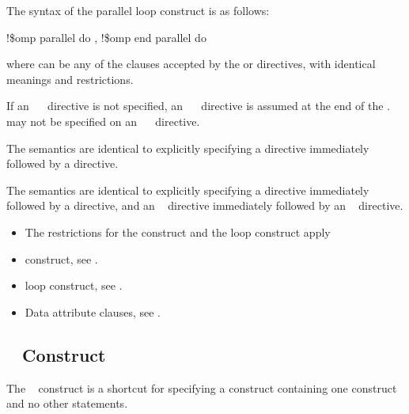 \fortranspecificstart
The syntax of the parallel loop construct is as follows:

\begin{boxedcode}
!\$omp parallel do \plc{[clause[ [},\plc{] clause] ... ]}
\plc{[}!\$omp end parallel do\plc{]} 
\end{boxedcode}

where  can be any of the clauses accepted by the  or  directives, 
with identical meanings and restrictions. 

If an ~~ directive is not specified, an ~~ directive is 
assumed at the end of the .  may not be specified on an 
~~ directive.
\fortranspecificend

\descr
\ccppspecificstart
The semantics are identical to explicitly specifying a  directive immediately 
followed by a  directive.
\ccppspecificend

\fortranspecificstart
The semantics are identical to explicitly specifying a  directive immediately 
followed by a  directive, and an ~ directive immediately followed by an 
~ directive. 
\fortranspecificend

\restrictions
\begin{itemize}
\item The restrictions for the  construct and the loop construct apply
\end{itemize}

\crossreferences
\begin{itemize}
\item {} construct, see 
.

\item loop construct, see 
.

\item Data attribute clauses, see 
.
\end{itemize}








\pagebreak

\subsection{~ Construct}
\label{subsec:parallel sections Construct}
\summary
The ~ construct is a shortcut for specifying a  
construct containing one  construct and no other statements.

